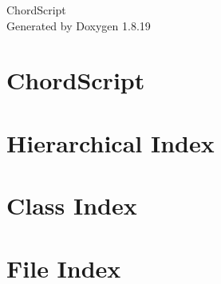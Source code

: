 \let\mypdfximage\pdfximage\def\pdfximage{\immediate\mypdfximage}\documentclass[twoside]{book}
\newcommand{\+}{\discretionary{\mbox{\scriptsize$\hookleftarrow$}}{}{}}
\newcommand{\clearemptydoublepage}{%
  \newpage{\pagestyle{empty}\cleardoublepage}%
}
\begin{document}
\hypersetup{pageanchor=false,
             bookmarksnumbered=true,
             pdfencoding=unicode
            }
\begin{titlepage}
\vspace*{7cm}
\begin{center}%
{\Large Chord\+Script }\\
\vspace*{1cm}
{\large Generated by Doxygen 1.8.19}\\
\end{center}
\end{titlepage}
\clearemptydoublepage
{}
\tableofcontents
\clearemptydoublepage
{}
\hypersetup{pageanchor=true}

\chapter{Chord\+Script}
\label{md_README}

\chapter{Hierarchical Index}

\chapter{Class Index}

\chapter{File Index}

\end{document}
